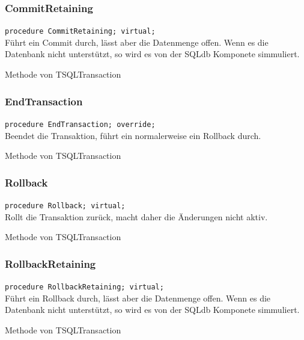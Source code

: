 \subsubsection{CommitRetaining}
\begin{description}
  \item \texttt{procedure CommitRetaining; virtual;}\\Führt ein Commit durch, lässt aber die Datenmenge offen. Wenn es die Datenbank nicht unterstützt, so wird es von der SQLdb Komponete simmuliert.
  \begin{description}
    \item Methode von TSQLTransaction
  \end{description}
\end{description}

\subsubsection{EndTransaction}
\begin{description}
  \item \texttt{procedure EndTransaction; override;}\\Beendet die Transaktion, führt ein normalerweise ein Rollback durch.
  \begin{description}
    \item Methode von TSQLTransaction
  \end{description}
\end{description}

\subsubsection{Rollback}
\begin{description}
  \item \texttt{procedure Rollback; virtual;}\\Rollt die Transaktion zurück, macht daher die Änderungen nicht aktiv.
  \begin{description}
    \item Methode von TSQLTransaction
  \end{description}
\end{description}

\subsubsection{RollbackRetaining}
\begin{description}
  \item \texttt{procedure RollbackRetaining; virtual;}\\Führt ein Rollback durch, lässt aber die Datenmenge offen. Wenn es die Datenbank nicht unterstützt, so wird es von der SQLdb Komponete simmuliert.
  \begin{description}
    \item Methode von TSQLTransaction
  \end{description}
\end{description}

